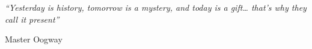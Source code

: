 \null\vfill
\textit{``Yesterday is history, tomorrow is a mystery, and today is a gift… that’s why they call it present''}

\begin{flushright}
Master Oogway
\end{flushright}

\vfill\vfill\vfill\vfill\vfill\vfill\null
\clearpage